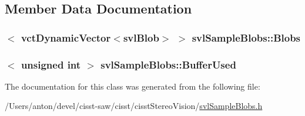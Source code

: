 \subsection{Member Data Documentation}
\hypertarget{classsvl_sample_blobs_a8b3a7c5bd623491b8ce0233e371db2e5}{}
\subsubsection[{Blobs}]{$<$ {\bf vct\+Dynamic\+Vector}$<${\bf svl\+Blob}$>$ $>$ svl\+Sample\+Blobs\+::\+Blobs\hspace{0.3cm}{\ttfamily [protected]}}\label{classsvl_sample_blobs_a8b3a7c5bd623491b8ce0233e371db2e5}
\hypertarget{classsvl_sample_blobs_a4ed2643831150b69245028dd4db73b6d}{}
\subsubsection[{Buffer\+Used}]{$<$ unsigned int $>$ svl\+Sample\+Blobs\+::\+Buffer\+Used\hspace{0.3cm}{\ttfamily [protected]}}\label{classsvl_sample_blobs_a4ed2643831150b69245028dd4db73b6d}


The documentation for this class was generated from the following file\+:\begin{DoxyCompactItemize}
\item 
/\+Users/anton/devel/cisst-\/saw/cisst/cisst\+Stereo\+Vision/\hyperlink{svl_sample_blobs_8h}{svl\+Sample\+Blobs.\+h}\end{DoxyCompactItemize}
